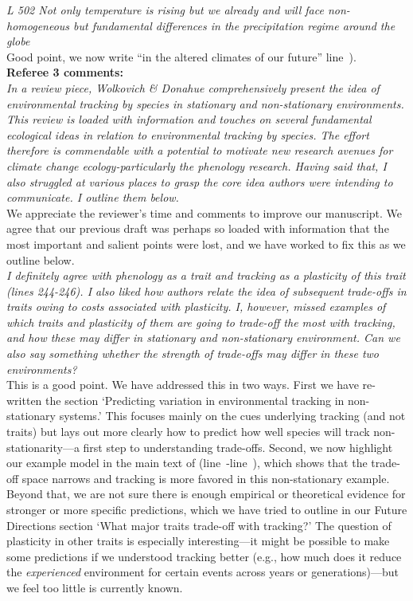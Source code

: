 \documentclass[11pt]{article}
\newcommand{\lr}[1]{line~\lineref{#1}}
\begin{document}
\emph{L 502 Not only temperature is rising but we already and will face non-homogeneous but
fundamental differences in the precipitation regime around the globe}\\

Good point, we now write ``in the altered climates of our future'' \lr{r2precip2}).\\


{\bf Referee 3 comments:} \\

\emph{In a review piece, Wolkovich \& Donahue comprehensively present the idea of environmental
tracking by species in stationary and non-stationary environments. This review is loaded with
information and touches on several fundamental ecological ideas in relation to environmental
tracking by species. The effort therefore is commendable with a potential to motivate new
research avenues for climate change ecology-particularly the phenology research. Having said
that, I also struggled at various places to grasp the core idea authors were intending to
communicate. I outline them below.}\\

We appreciate the reviewer's time and comments to improve our manuscript. We agree that our previous draft was perhaps so loaded with information that the most important and salient points were lost, and we have worked to fix this as we outline below.\\

\emph{I definitely agree with phenology as a trait and tracking as a plasticity of this trait
(lines 244-246). I also liked how authors relate the idea of subsequent trade-offs in traits
owing to costs associated with plasticity. I, however, missed examples of which traits and
plasticity of them are going to trade-off the most with tracking, and how these may differ in
stationary and non-stationary environment. Can we also say something whether the strength of
trade-offs may differ in these two environments?}\\

This is a good point. We have addressed this in two ways. First we have re-written the section `Predicting variation in environmental tracking in non-stationary systems.' This focuses mainly on the cues underlying tracking (and not traits) but lays out more clearly how to predict how well species will track non-stationarity---a first step to understanding trade-offs. Second, we now highlight our example model in the main text of (\lr{r1dS1}-\lr{r1dE1}), which shows that the trade-off space narrows and tracking is more favored in this non-stationary example. Beyond that, we are not sure there is enough empirical or theoretical evidence for stronger or more specific predictions, which we have tried to outline in our Future Directions section `What major traits trade-off with tracking?' The question of plasticity in other traits is especially interesting---it might be possible to make some predictions if we understood tracking better (e.g., how much does it reduce the \emph{experienced} environment for certain events across years or generations)---but we feel too little is currently known.\\
\end{document}
